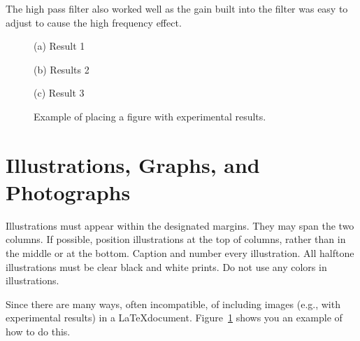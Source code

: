 \documentclass{article}
\begin{document}
The high pass filter also worked well as the gain built into the filter was easy to adjust to cause the high frequency effect.





%
\begin{figure}[t]
\begin{minipage}[b]{1.0\linewidth}
  \centering
  \vspace{1.5cm}
  \centerline{(a) Result 1}\medskip
\end{minipage}
%
\begin{minipage}[b]{.48\linewidth}
  \centering
  \vspace{1.5cm}
  \centerline{(b) Results 2}\medskip
\end{minipage}
\hfill
\begin{minipage}[b]{0.48\linewidth}
  \centering
  \vspace{1.5cm}
  \centerline{(c) Result 3}\medskip
\end{minipage}
%
\caption{Example of placing a figure with experimental results.}
\label{fig:res}
\end{figure}



\section{Illustrations, Graphs, and Photographs}
\label{sec:illust}

Illustrations must appear within the designated margins. They may span the two columns. If possible, position illustrations at the top of columns, rather than in the middle or at the bottom. Caption and number every illustration. All halftone illustrations must be clear black and white prints.  Do not use any colors in illustrations.

Since there are many ways, often incompatible, of including images (e.g., with experimental results) in a \LaTeX document. Figure~\ref{fig:res} shows you an example of how to do this.
\end{document}
